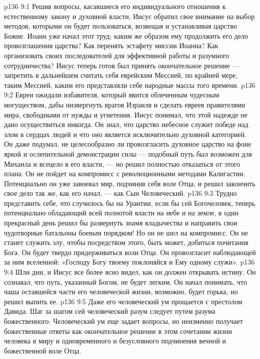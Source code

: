 \vs p136 9:1 Решив вопросы, касавшиеся его индивидуального отношения к естественному закону и духовной власти, Иисус обратил свое внимание на выбор методов, которыми он будет пользоваться, возвещая и устанавливая царство Божие. Иоанн уже начал этот труд; каким же образом ему продолжить его дело провозглашения царства? Как перенять эстафету миссии Иоанна? Как организовать своих последователей для эффективной работы и разумного сотрудничества? Иисус теперь готов был принять окончательное решение --- запретить в дальнейшем считать себя еврейским Мессией, по крайней мере, таким Мессией, каким его представляли себе народные массы того времени.
\vs p136 9:2 Евреи ожидали избавителя, который явится облеченным чудесным могуществом, дабы низвергнуть врагов Израиля и сделать евреев правителями мира, свободными от нужды и угнетения. Иисус понимал, что этой надежде не дано осуществиться никогда. Он знал, что царство небесное служит победе над злом в сердцах людей и что оно является исключительно духовной категорией. Он даже подумал, не целесообразно ли провозгласить духовное царство на фоне яркой и ослепительной демонстрации силы --- подобный путь был возможен для Михаила и всецело в его власти, --- но решил полностью отказаться от этого плана. Он не пойдет на компромисс с революционными методами Калигастии. Потенциально он уже завоевал мир, подчинив себя воле Отца, и решил закончить свое дело так же, как его начал, --- как Сын Человеческий.
\vs p136 9:3 Трудно представить себе, что случилось бы на Урантии, если бы сей Богочеловек, теперь потенциально обладающий всей полнотой власти на небе и на земле, в один прекрасный день решил бы развернуть знамя владычества и направить свои чудотворные батальоны боевым порядком! Но он не шел на компромисс. Он не станет служить злу, чтобы посредством этого, быть может, добиться почитания Бога. Он будет твердо придерживаться воли Отца. Он провозгласит наблюдающей за ним вселенной: «Господу Богу твоему поклоняйся и Ему одному служи».
\vs p136 9:4 Шли дни, и Иисус все более ясно видел, как он должен открывать истину. Он сознавал, что путь, указанный Богом, не будет легким. Он начал понимать, что чаша оставшейся части его человеческой жизни, возможно, будет горька, но решил выпить ее.
\vs p136 9:5 Даже его человеческий ум прощается с престолом Давида. Шаг за шагом сей человеческий разум следует путем разума божественного. Человеческий ум еще задает вопросы, но неизменно получает божественные ответы как окончательное решение в этом сочетании жизни человека в миру и одновременного и безусловного подчинения вечной и божественной воле Отца.
